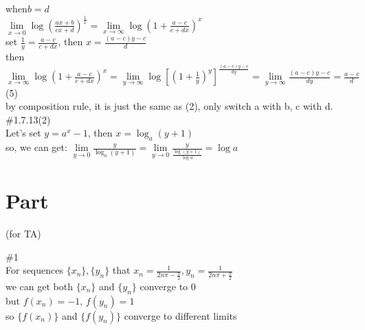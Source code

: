 \documentclass{article}
\begin{document}
when$b=d$\\

$\lim \limits_{x \to 0}\log\left(\displaystyle\frac{ax+b}{cx+d}\right)^{\displaystyle\frac{1}{x}}=\lim \limits_{x \to \infty}\log\left(1+\frac{a-c}{c+dx}\right)^x$\\

set $\displaystyle\frac{1}{y}=\frac{a-c}{c+dx}$, then $x=\displaystyle\frac{(a-c)y-c}{d}$\\

then  $\displaystyle\lim \limits_{x \to \infty}\log\left(1+\frac{a-c}{c+dx}\right)^x=\lim \limits_{y \to \infty}\log\left[\left(1+\frac{1}{y}\right)^y\right]^{\frac{(a-c)y-c}{dy}}=\lim \limits_{y \to \infty}\frac{(a-c)y-c}{dy}=\frac{a-c}{d}$\\

(5)\\

by composition rule, it is just the same as (2), only switch a with b, c with d.\\

\textcolor[rgb]{0.00,0.00,0.50}{\#1.7.13(2)}\\

Let's set $y=a^x-1$, then $x=\log_a(y+1)$\\

so, we can get: $\lim \limits_{y \to 0}\displaystyle\frac{y}{\log_a(y+1)}=\lim \limits_{y \to 0}\frac{y}{\frac{\log(y+1)}{\log a}}=\log a$\\

\section{\textcolor[rgb]{0.70,0.00,0.00}{Part \uppercase\expandafter{}}}(for TA)

\vspace{3.5mm}

\textcolor[rgb]{0.00,0.00,0.50}{\#1}\\

For sequences $\{x_n\}, \{y_n\}$ that $x_n=\displaystyle\frac{1}{2n\pi-\frac{\pi}{2}}, y_n=\displaystyle\frac{1}{2n\pi+\frac{\pi}{2}}$\\

we can get both $\{x_n\}$ and $\{y_n\}$ converge to $0$\\

but $f(x_n)=-1$, $f(y_n)=1$\\

so $\{f(x_n)\}$ and $\{f(y_n)\}$ converge to different limits\\
\end{document}
